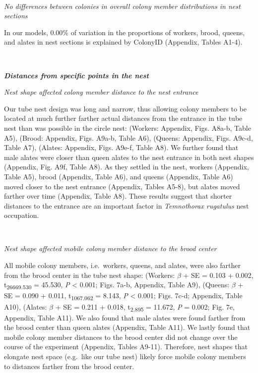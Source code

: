 \documentclass[3p]{elsarticle} %
\begin{document}
~

\emph{No differences between colonies in overall colony member
distributions in nest sections}

In our models, 0.00\% of variation in the proportions of workers, brood,
queens, and alates in nest sections is explained by ColonyID (Appendix,
Tables A1-4).

~

\textbf{\emph{Distances from specific points in the nest}}

\emph{Nest shape affected colony member distance to the nest entrance}

Our tube nest design was long and narrow, thus allowing colony members
to be located at much further farther actual distances from the entrance
in the tube nest than was possible in the circle nest: (Workers:
Appendix, Figs. A8a-b, Table A5), (Brood: Appendix, Figs. A9a-b, Table
A6), (Queens: Appendix, Figs. A9c-d, Table A7), (Alates: Appendix, Figs.
A9e-f, Table A8). We further found that male alates were closer than
queen alates to the nest entrance in both nest shapes (Appendix, Fig.
A9f, Table A8). As they settled in the nest, workers (Appendix, Table
A5), brood (Appendix, Table A6), and queens (Appendix, Table A6) moved
closer to the nest entrance (Appendix, Tables A5-8), but alates moved
farther over time (Appendix, Table A8). These results suggest that
shorter distances to the entrance are an important factor in
\emph{Temnothorax rugatulus} nest occupation.

~

\emph{Nest shape affected mobile colony member distance to the brood
center}

All mobile colony members, i.e.~workers, queens, and alates, were also
farther from the brood center in the tube nest shape: (Workers:
\(\beta\) + SE = 0.103 + 0.002, t\textsubscript{26669.530} = 45.530,
\emph{P} \textless{} 0.001; Figs. 7a-b, Appendix, Table A9), (Queens:
\(\beta\) + SE = 0.090 + 0.011, t\textsubscript{1067.062} = 8.143,
\emph{P} \textless{} 0.001; Figs. 7c-d; Appendix, Table A10), (Alates:
\(\beta\) + SE = 0.211 + 0.018, t\textsubscript{2.895} = 11.672,
\emph{P} = 0.002; Fig. 7e, Appendix, Table A11). We also found that male
alates were found farther from the brood center than queen alates
(Appendix, Table A11). We lastly found that mobile colony member
distances to the brood center did not change over the course of the
experiment (Appendix, Tables A9-11). Therefore, nest shapes that
elongate nest space (e.g.~like our tube nest) likely force mobile colony
members to distances farther from the brood center.
\end{document}
